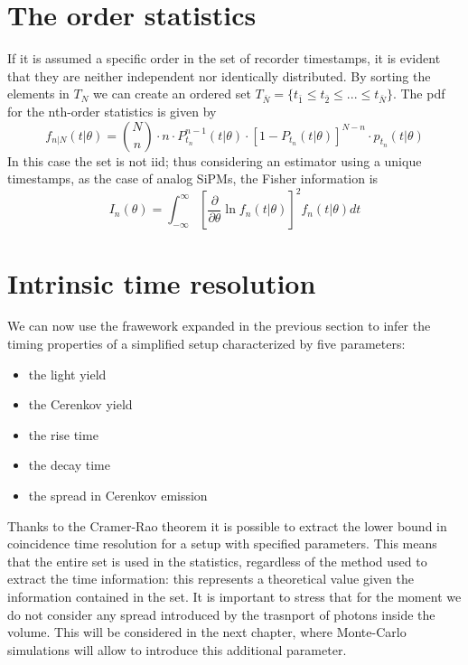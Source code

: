 \newpage

\section{The order statistics}
If it is assumed a specific order in the set of recorder timestamps, it is evident that they are neither independent nor identically distributed. By sorting the elements in $T_{N}$ we can create an ordered set $T_{\bar{N}} = \{ t_{\bar{1}} \leq t_{\bar{2}} \leq ... \leq t_{\bar{N}} \}$. The pdf for the nth-order statistics is given by\cite{Seifert2012}
\begin{equation}
f_{n|N} (t|\theta) = \binom{N}{n} \cdot n \cdot P_{t_{n}}^{n-1}(t|\theta) \cdot \left[ 1-P_{t_{n}}(t|\theta) \right] ^{N-n}\cdot p_{t_{n}} (t|\theta)
\end{equation}
In this case the set is not iid; thus considering an estimator using a unique timestamps, as the case of analog SiPMs, the Fisher information is
\begin{equation}
I_{n}(\theta) = \int _{-\infty} ^{\infty} \left[ \frac{\partial}{\partial \theta} \ln f_{n}(t|\theta) \right] ^{2} f_{n}(t|\theta)dt
\end{equation}
   
\section{Intrinsic time resolution}

We can now use the frawework expanded in the previous section to infer the timing properties of a simplified setup characterized by five parameters:
\begin{itemize}
\item the light yield
\item the Cerenkov yield
\item the rise time
\item the decay time
\item the spread in Cerenkov emission 
\end{itemize}
Thanks to the Cramer-Rao theorem it is possible to extract the lower bound in coincidence time resolution for a setup with specified parameters. This means that the entire set is used in the statistics, regardless of the method used to extract the time information: this represents a theoretical value given the information contained in the set.
It is important to stress that for the moment we do not consider any spread introduced by the trasnport of photons inside the volume. This will be considered in the next chapter, where Monte-Carlo simulations will allow to introduce this additional parameter.

